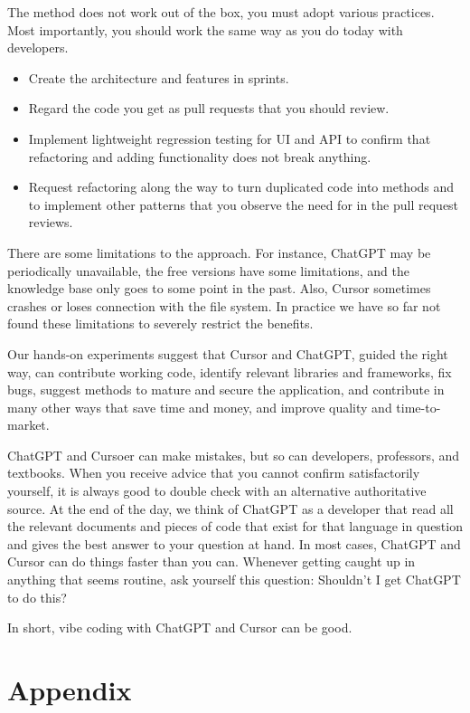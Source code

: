 \documentclass[runningheads]{llncs}
\begin{document}
The method does not work out of the box, you must adopt various practices. Most importantly, you should work the same way as you do today with developers.
\begin{itemize}
    \item Create the architecture and features in sprints.
    \item Regard the code you get as pull requests that you should review.
    \item Implement lightweight regression testing for UI and API to confirm that refactoring and adding functionality does not break anything.
    \item Request refactoring along the way to turn duplicated code into methods and to implement other patterns that you observe the need for in the pull request reviews.
\end{itemize}

\noindent There are some limitations to the approach. For instance, ChatGPT may be periodically unavailable, the free versions have some limitations, and the knowledge base only goes to some point in the past. Also, Cursor sometimes crashes or loses connection with the file system. In practice we have so far not found these limitations to severely restrict the benefits.

Our hands-on experiments suggest that Cursor and ChatGPT, guided the right way, can contribute working code, identify relevant libraries and frameworks, fix bugs, suggest methods to mature and secure the application, and contribute in many other ways that save time and money, and improve quality and time-to-market.

ChatGPT and Cursoer can make mistakes, but so can developers, professors, and textbooks. When you receive advice that you cannot confirm satisfactorily yourself, it is always good to double check with an alternative authoritative source. At the end of the day, we think of ChatGPT as a developer that read all the relevant documents and pieces of code that exist for that language in question and gives the best answer to your question at hand. In most cases, ChatGPT and Cursor can do things faster than you can. Whenever getting caught up in anything that seems routine, ask yourself this question: Shouldn't I get ChatGPT to do this?

In short, vibe coding with ChatGPT and Cursor can be good.


 

\newpage
\section*{Appendix}

\end{document}
